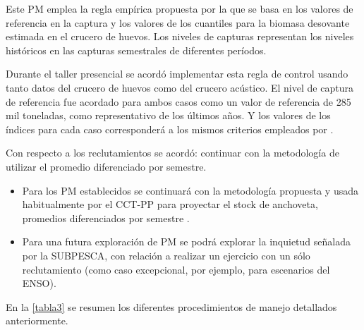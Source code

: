 Este PM emplea la regla empírica propuesta por \cite{canales2021empirical} la que se basa en los valores de referencia en la captura y los valores de los cuantiles para la biomasa desovante estimada en el crucero de huevos. Los niveles de capturas representan los niveles históricos en las capturas semestrales de diferentes períodos.
\newline

Durante el taller presencial se acordó implementar esta regla de control usando tanto datos del crucero de huevos como del crucero acústico. El nivel de captura de referencia fue acordado para ambos casos como un valor de referencia de 285 mil toneladas, como representativo de los últimos años. Y los valores de los índices para cada caso corresponderá a los mismos criterios empleados por \cite{canales2021empirical}. 
\newline

Con respecto a los reclutamientos se acordó: continuar con la metodología de utilizar el promedio diferenciado por semestre.

\begin{itemize}
    \item Para los PM establecidos se continuará con la metodología propuesta y usada habitualmente por el CCT-PP para proyectar el stock de anchoveta, promedios diferenciados por semestre \citep{espinola2023}. 
    \item Para una futura exploración de PM se podrá explorar la inquietud señalada por la SUBPESCA, con relación a realizar un ejercicio con un sólo reclutamiento (como caso excepcional, por ejemplo, para escenarios del ENSO).
\end{itemize}

En la \ref{tabla3} se resumen los diferentes procedimientos de manejo detallados anteriormente.

